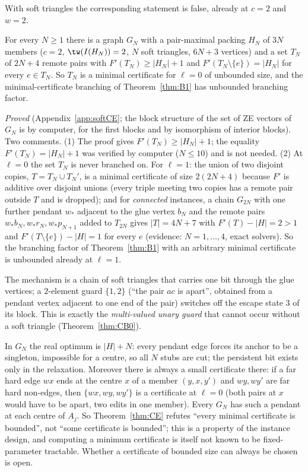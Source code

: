 With soft triangles the corresponding statement is false, already at $c=2$ and $w=2$.
\begin{theorem}\label{thm:CE}
For every $N\ge1$ there is a graph $G_N$ with a pair-maximal packing $H_N$ of $3N$ members ($c=2$, $\tw(I(H_N))=2$, $N$ soft triangles, $6N+3$ vertices) and a set $T_N$ of $2N+4$ remote pairs with $F'(T_N)\ge|H_N|+1$ and $F'(T_N\setminus\{e\})=|H_N|$ for every $e\in T_N$. So $T_N$ is a minimal certificate for $\ell=0$ of unbounded size, and the minimal-certificate branching of Theorem~\ref{thm:B1} has unbounded branching factor.
\end{theorem}
\emph{Proved} (Appendix~\ref{app:softCE}; the block structure of the set of ZE vectors of $G_N$ is by computer, for the first blocks and by isomorphism of interior blocks). Two comments. (1) The proof gives $F'(T_N)\ge|H_N|+1$; the equality $F'(T_N)=|H_N|+1$ was verified by computer ($N\le10$) and is not needed. (2) At $\ell=0$ the set $T_N$ is never branched on. For $\ell=1$: the union of two disjoint copies, $T=T_N\cup T_N'$, is a minimal certificate of size $2(2N+4)$ because $F'$ is additive over disjoint unions (every triple meeting two copies has a remote pair outside $T$ and is dropped); and for \emph{connected} instances, a chain $G_{2N}$ with one further pendant $w_*$ adjacent to the glue vertex $b_N$ and the remote pairs $w_*b_N,w_*r_N,w_*p_{N+1}$ added to $T_{2N}$ gives $|T|=4N+7$ with $F'(T)-|H|=2>1$ and $F'(T\setminus\{e\})-|H|=1$ for every $e$ (evidence: $N=1,\dots,4$, exact solvers). So the branching factor of Theorem~\ref{thm:B1} with an arbitrary minimal certificate is unbounded already at $\ell=1$.

The mechanism is a chain of soft triangles that carries one bit through the glue vertices; a $2$-element guard $\{1,2\}$ (``the pair $ac$ is apart'', obtained from a pendant vertex adjacent to one end of the pair) switches off the escape state $3$ of its block. This is exactly the \emph{multi-valued unary guard} that cannot occur without a soft triangle (Theorem~\ref{thm:CB0}).
\begin{remark}\label{rem:mincert}
In $G_N$ the real optimum is $|H|+N$: every pendant edge forces its anchor to be a singleton, impossible for a centre, so all $N$ stubs are cut; the persistent bit exists only in the relaxation. Moreover there is always a small certificate there: if a far hard edge $wx$ ends at the centre $x$ of a member $(y,x,y')$ and $wy,wy'$ are far hard non-edges, then $\{wx,wy,wy'\}$ is a certificate at $\ell=0$ (both pairs at $x$ would have to be apart, two edits in one member). Every $G_N$ has such a pendant at each centre of $A_j$. So Theorem~\ref{thm:CE} refutes ``every minimal certificate is bounded'', not ``some certificate is bounded''; this is a property of the instance design, and computing a minimum certificate is itself not known to be fixed-parameter tractable. Whether a certificate of bounded size can always be chosen is open.
\end{remark}

